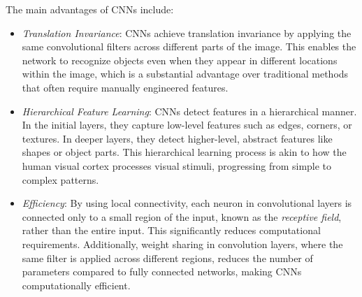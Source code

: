 The main advantages of CNNs include:
\begin{itemize}
    \item \textit{Translation Invariance}: CNNs achieve translation invariance by applying the same convolutional filters across different parts of the image. This enables the network to recognize objects even when they appear in different locations within the image, which is a substantial advantage over traditional methods that often require manually engineered features.

    \item \textit{Hierarchical Feature Learning}: CNNs detect features in a hierarchical manner. In the initial layers, they capture low-level features such as edges, corners, or textures. In deeper layers, they detect higher-level, abstract features like shapes or object parts. This hierarchical learning process is akin to how the human visual cortex processes visual stimuli, progressing from simple to complex patterns.

    \item \textit{Efficiency}: By using local connectivity, each neuron in convolutional layers is connected only to a small region of the input, known as the \textit{receptive field}, rather than the entire input. This significantly reduces computational requirements. Additionally, weight sharing in convolution layers, where the same filter is applied across different regions, reduces the number of parameters compared to fully connected networks, making CNNs computationally efficient.
\end{itemize}

